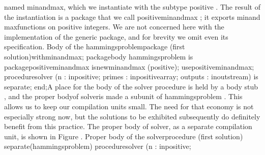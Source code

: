 named \tyxffmxmono[]min\Symuns[]and\Symuns[]max\tyxffmxendmono[],
which we instantiate with the subtype \tyxffmxmono[]positive%
\tyxffmxendmono[]. The result of the instantiation is a package that
we call \tyxffmxmono[]positive\Symuns[]min\Symuns[]and\Symuns[]max%
\tyxffmxendmono[]; it exports \tyxffmxmono[]min\tyxffmxendmono[] and
\tyxffmxmono[]max\tyxffmxendmono[] functions on positive integers.
We are not concerned here with the implementation of the generic package,
and for brevity we omit even its specification.
\Parbox[]
Body of the %
\tyxffmxmono[]hammings\Symuns[]problem\tyxffmxendmono[] package (first
solution)\FgEndcap[]
\Comp[]\tyxtstxbf[]with\tyxtstxendbf[] min\Symuns[]and\Symuns[]max;
\tyxtstxbf[]package\tyxtstxendbf[] \tyxtstxbf[]body%
\tyxtstxendbf[] hammings\Symuns[]problem \tyxtstxbf[]is%
\tyxtstxendbf[]
   \tyxtstxbf[]package\tyxtstxendbf[] positive\Symuns[]min\Symuns[]and\Symuns[]max %
\tyxtstxbf[]is\tyxtstxendbf[] \tyxtstxbf[]new\tyxtstxendbf[] min\Symuns[]and\Symuns[]max (positive);
   \tyxtstxbf[]use\tyxtstxendbf[]     positive\Symuns[]min\Symuns[]and\Symuns[]max;
   \tyxtstxbf[]procedure\tyxtstxendbf[] solver (n       : %
\tyxtstxbf[]in\tyxtstxendbf[]     positive;
                     primes  : \tyxtstxbf[]in\tyxtstxendbf[]     positive\Symuns[]array;
                     outputs : \tyxtstxbf[]in\tyxtstxendbf[] %
\tyxtstxbf[]out\tyxtstxendbf[] stream) \tyxtstxbf[]is%
\tyxtstxendbf[] \tyxtstxbf[]separate\tyxtstxendbf[];
\tyxtstxbf[]end\tyxtstxendbf[];\Endcomp[]
\EndParbox[]
\FgEndblock[]
\Endpara[]
\Para[]A place for the body of the \tyxffmxmono[]solver%
\tyxffmxendmono[] procedure is held by a \txtxemph[]body stub%
\txtxendemph[], and the \txtxemph[]proper body\txtxendemph[] of %
\tyxffmxmono[]solver\tyxffmxendmono[] is made a \txtxemph[]subunit%
\txtxendemph[] of \tyxffmxmono[]hammings\Symuns[]problem%
\tyxffmxendmono[]. This allows us to keep our compilation units small.
The need for that economy is not especially strong now, but the solutions
to be exhibited subsequently do definitely benefit from this practice.
The proper body of \tyxffmxmono[]solver\tyxffmxendmono[], as a separate
compilation unit, is shown in Figure .
\FgBlock[]
\Parbox[]
Proper body of the %
\tyxffmxmono[]solver\tyxffmxendmono[] procedure (first solution)%
\FgEndcap[]
\Comp[]\tyxtstxbf[]separate\tyxtstxendbf[] (hammings\Symuns[]problem)
\tyxtstxbf[]procedure\tyxtstxendbf[] solver (n       : %
\tyxtstxbf[]in\tyxtstxendbf[]     positive;
